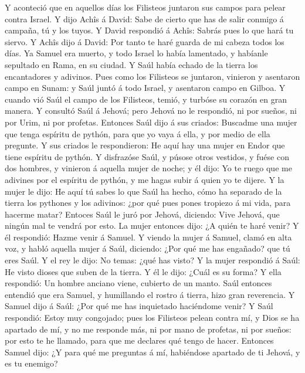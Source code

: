  Y aconteció que en aquellos días los Filisteos juntaron sus
campos para pelear contra Israel. Y dijo Achîs á David: Sabe de cierto
que has de salir conmigo á campaña, tú y los tuyos.  Y David
respondió á Achîs: Sabrás pues lo que hará tu siervo. Y Achîs dijo á
David: Por tanto te haré guarda de mi cabeza todos los días.
 Ya Samuel era muerto, y todo Israel lo había lamentado, y
habíanle sepultado en Rama, en su ciudad. Y Saúl había echado de la
tierra los encantadores y adivinos.  Pues como los Filisteos
se juntaron, vinieron y asentaron campo en Sunam: y Saúl juntó á todo
Israel, y asentaron campo en Gilboa.  Y cuando vió Saúl el
campo de los Filisteos, temió, y turbóse su corazón en gran manera.
 Y consultó Saúl á Jehová; pero Jehová no le respondió, ni
por sueños, ni por Urim, ni por profetas.  Entonces Saúl
dijo á sus criados: Buscadme una mujer que tenga espíritu de pythón,
para que yo vaya á ella, y por medio de ella pregunte. Y sus criados le
respondieron: He aquí hay una mujer en Endor que tiene espíritu de
pythón.  Y disfrazóse Saúl, y púsose otros vestidos, y fuése
con dos hombres, y vinieron á aquella mujer de noche; y él dijo: Yo te
ruego que me adivines por el espíritu de pythón, y me hagas subir á
quien yo te dijere.  Y la mujer le dijo: He aquí tú sabes lo
que Saúl ha hecho, cómo ha separado de la tierra los pythones y los
adivinos: ¿por qué pues pones tropiezo á mi vida, para hacerme matar?
 Entoces Saúl le juró por Jehová, diciendo: Vive Jehová,
que ningún mal te vendrá por esto.  La mujer entonces dijo:
¿A quién te haré venir? Y él respondió: Hazme venir á Samuel.
 Y viendo la mujer á Samuel, clamó en alta voz, y habló
aquella mujer á Saúl, diciendo:  ¿Por qué me has engañado?
que tú eres Saúl. Y el rey le dijo: No temas: ¿qué has visto? Y la mujer
respondió á Saúl: He visto dioses que suben de la tierra. 
Y él le dijo: ¿Cuál es su forma? Y ella respondió: Un hombre anciano
viene, cubierto de un manto. Saúl entonces entendió que era Samuel, y
humillando el rostro á tierra, hizo gran reverencia.  Y
Samuel dijo á Saúl: ¿Por qué me has inquietado haciéndome venir? Y Saúl
respondió: Estoy muy congojado; pues los Filisteos pelean contra mí, y
Dios se ha apartado de mí, y no me responde más, ni por mano de
profetas, ni por sueños: por esto te he llamado, para que me declares
qué tengo de hacer.  Entonces Samuel dijo: ¿Y para qué me
preguntas á mí, habiéndose apartado de ti Jehová, y es tu enemigo?
